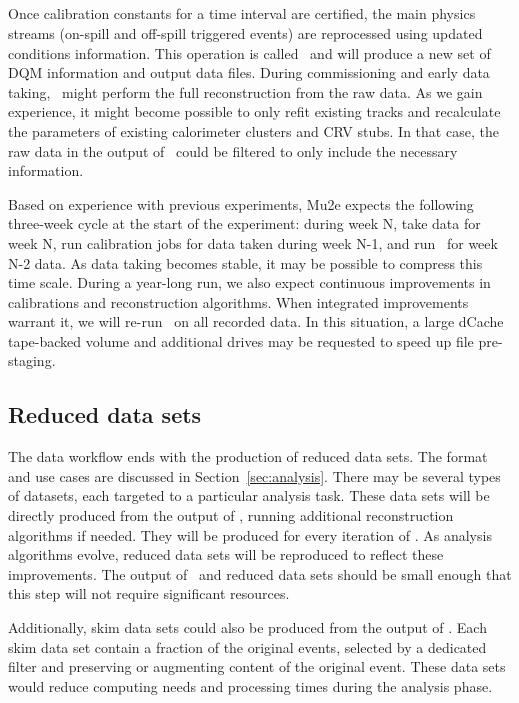 \subsection{\passtwo}
Once calibration constants for a time interval are certified, the main physics streams (on-spill and off-spill triggered events) are reprocessed using updated conditions information. This operation is called \passtwo\ and will produce a new set of DQM information and output data files. During commissioning and early data taking, \passtwo\ might perform the full reconstruction from the raw data. As we gain experience, it might become possible to only refit existing tracks and recalculate the parameters of existing calorimeter clusters and CRV stubs. In that case, the raw data in the output of \passone\ could be filtered to only include the necessary information.

Based on experience with previous experiments, Mu2e expects the following three-week cycle at the start of the experiment: during week N, take data for week N, run calibration jobs for data taken during week N-1, and run \passtwo\ for week N-2 data. As data taking becomes stable, it may be possible to compress this time scale. During a year-long run, we also expect continuous improvements in calibrations and reconstruction algorithms. When integrated improvements warrant it, we will re-run \passtwo\ on all recorded data. In this situation, a large dCache tape-backed volume and additional drives may be requested to speed up file pre-staging.  


\subsection{Reduced data sets}
The data workflow ends with the production of reduced data sets. The format and use cases are discussed in Section~\ref{sec:analysis}. There may be several types of datasets, each targeted to a particular analysis task. These data sets will be directly produced from the output of \passtwo, running additional reconstruction algorithms if needed. They will be produced for every iteration of \passtwo. As analysis algorithms evolve, reduced data sets will be reproduced to reflect these improvements. The output of \passtwo\ and reduced data sets should be small enough that this step will not require significant resources.

Additionally, skim data sets could also be produced from the output of \passtwo. Each skim data set contain a fraction of the original events, selected by a dedicated filter and preserving or augmenting content of the original event. These data sets would reduce computing needs and processing times during the analysis phase.   
